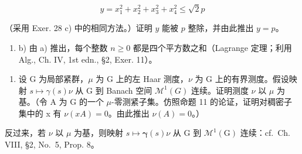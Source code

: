 \[
y = x _ {1} ^ {2} + x _ {2} ^ {2} + x _ {3} ^ {2} + x _ {4} ^ {2} \leqslant \sqrt {2} p
\]

（采用 Exer. 28 c) 中的相同方法。）证明 \(y\) 能被 \(p\) 整除，并由此推出 \(y = p\)。

\begin{enumerate}
\def\labelenumi{\alph{enumi})}
\setcounter{enumi}{1}
\tightlist
\item
  b) 由 a) 推出，每个整数 \(n \geqslant 0\) 都是四个平方数之和（Lagrange 定理；利用 Alg., Ch. IV, 1st edn., §2, Exer. 11）。
\end{enumerate}

\begin{enumerate}
\def\labelenumi{\arabic{enumi})}
\setcounter{enumi}{29}
\tightlist
\item
  设 G 为局部紧群，\(\mu\) 为 G 上的左 Haar 测度，\(\nu\) 为 G 上的有界测度。假设映射 \(s \mapsto \gamma(s)\nu\) 从 G 到 Banach 空间 \(\mathcal{M}^{1}(G)\) 连续。证明测度 \(\nu\) 以 \(\mu\) 为基。（令 A 为 G 的一个 \(\mu\)-零测紧子集。仿照命题 11 的论证，证明对稠密子集中的 x 有 \(\nu(xA)=0\)。由此推出 \(\nu(A)=0\)。）
\end{enumerate}

反过来，若 \(\nu\) 以 \(\mu\) 为基，则映射 \(s \mapsto \pmb{\gamma}(s)\nu\) 从 G 到 \(\mathcal{M}^1(\mathrm{G})\) 连续：cf.~Ch. VIII, §2, No.~5, Prop. 8。
\relax{}
